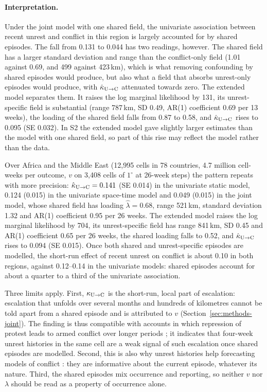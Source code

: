 \paragraph{Interpretation.} Under the joint model with one shared field, the univariate
association between recent unrest and conflict in this region is largely accounted for
by shared episodes. The fall from 0.131 to 0.044 has two readings, however. The shared
field has a larger standard deviation and range than the conflict-only field (1.01
against 0.69, and 499 against 423\,km), which is what removing confounding by shared
episodes would produce, but also what a field that absorbs unrest-only episodes would
produce, with $\hat\kappa_{\mathrm{U}\to\mathrm{C}}$ attenuated towards zero. The extended model separates them.
It raises the log marginal likelihood by 131, its unrest-specific field is substantial
(range 787\,km, SD 0.49, AR(1) coefficient 0.69 per 13 weeks), the loading of the
shared field falls from 0.87 to 0.58, and $\hat\kappa_{\mathrm{U}\to\mathrm{C}}$ rises to 0.095 (SE 0.032). In
S2 the extended model gave slightly larger estimates than the model with one shared
field, so part of this rise may reflect the model rather than the data.

Over Africa and the Middle East (12{,}995 cells in 78 countries, 4.7 million
cell-weeks per outcome, $v$ on 3{,}408 cells of $1^\circ$ at 26-week steps) the
pattern repeats with more precision: $\hat\kappa_{\mathrm{U}\to\mathrm{C}}  = 0.141$ (SE 0.014) in the univariate
static model, 0.124 (0.015) in the univariate space-time model and 0.049 (0.015) in the
joint model, whose shared field has loading $\hat\lambda = 0.68$, range 521\,km,
standard deviation 1.32 and AR(1) coefficient 0.95 per 26 weeks.
The extended model raises the log marginal likelihood by 704, its unrest-specific
field has range 841\,km, SD 0.45 and AR(1) coefficient 0.65 per 26 weeks, the shared
loading falls to 0.52, and $\hat\kappa_{\mathrm{U}\to\mathrm{C}}$ rises to 0.094 (SE 0.015). Once both
shared and unrest-specific episodes are modelled, the short-run effect of recent unrest
on conflict is about 0.10 in both regions, against 0.12--0.14 in the univariate
models: shared episodes account for about a quarter to a third of the univariate
association. 

Three limits apply. First, $\kappa_{\mathrm{U}\to\mathrm{C}}$ is the short-run, local part of escalation:
escalation that unfolds over several months and hundreds of kilometres cannot be told
apart from a shared episode and is attributed to $v$
(Section~\ref{sec:methods-joint}). The finding is thus compatible with accounts in
which repression of protest leads to armed conflict over longer periods
\citep{ritter2016preventing, ryckman2020turn, chenoweth2017violent, rod2023protest};
it indicates that four-week unrest histories in the same cell are a weak signal of
such escalation once shared episodes are modelled. Second, this is also why unrest
histories help forecasting models of conflict \citep{rod2025predicting}: they are
informative about the current episode, whatever its nature. Third, the shared
episodes mix occurrence and reporting, so neither $v$ nor $\lambda$ should be read as
a property of occurrence alone.

